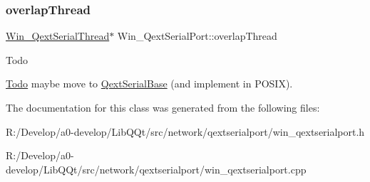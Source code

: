 \subsubsection{\texorpdfstring{overlap\+Thread}{overlapThread}}
{\footnotesize\ttfamily \mbox{\hyperlink{class_win___qext_serial_thread}{Win\+\_\+\+Qext\+Serial\+Thread}}$\ast$ Win\+\_\+\+Qext\+Serial\+Port\+::overlap\+Thread\hspace{0.3cm}{\ttfamily [protected]}}

\begin{DoxyRefDesc}{Todo}
\item[\mbox{\hyperlink{todo__todo000005}{Todo}}]maybe move to \mbox{\hyperlink{class_qext_serial_base}{Qext\+Serial\+Base}} (and implement in P\+O\+S\+IX). \end{DoxyRefDesc}


The documentation for this class was generated from the following files\+:\begin{DoxyCompactItemize}
\item 
R\+:/\+Develop/a0-\/develop/\+Lib\+Q\+Qt/src/network/qextserialport/win\+\_\+qextserialport.\+h\item 
R\+:/\+Develop/a0-\/develop/\+Lib\+Q\+Qt/src/network/qextserialport/win\+\_\+qextserialport.\+cpp\end{DoxyCompactItemize}
